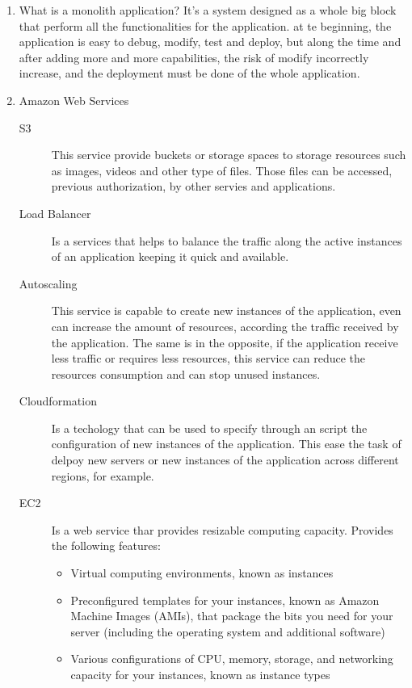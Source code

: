 \begin{multicols}{2}
\begin{enumerate}
\item What is a monolith application? It's a system designed as a whole big block that perform all the functionalities for the application. at te beginning, the application is easy to debug, modify, test and deploy, but along the time and after adding more and more capabilities, the risk of modify incorrectly increase, and the deployment must be done of the whole application.

\item Amazon Web Services
\begin{description}

\item[S3] This service provide buckets or storage spaces to storage resources such as images, videos and other type of files. Those files can be accessed, previous authorization, by other servies and applications.

\item[Load Balancer] Is a services that helps to balance the traffic along the active instances of an application keeping it quick and available.

\item[Autoscaling] This service is capable to create new instances of the application, even can increase the amount of resources, according the traffic received by the application. The same is in the opposite, if the application receive less traffic or requires less resources, this service can reduce the resources consumption and can stop unused instances.

\item[Cloudformation] Is a techology that can be used to specify through an script the configuration of new instances of the application. This ease the task of delpoy new servers or new instances of the application across different regions, for example.

\item[EC2] Is a web service thar provides resizable computing capacity. Provides the following features:
\begin{itemize}
\item Virtual computing environments, known as instances

\item Preconfigured templates for your instances, known as Amazon Machine Images (AMIs), that package the bits you need for your server (including the operating system and additional software)

\item Various configurations of CPU, memory, storage, and networking capacity for your instances, known as instance types


\end{itemize}
\end{description}
\end{enumerate}
\end{multicols}
